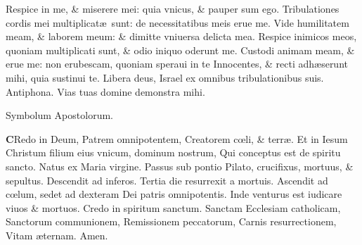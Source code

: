 \documentclass[a5paper,10pt]{book}
\def\ae{æ}
\def\oe{œ}
\begin{document}
\begin{multicols*}{2}
\newline \color{red} R\color{black}espice in me, \& miserere mei: quia vnicus, \& pauper sum ego.
\newline \color{red} T\color{black}ribulationes cordis mei multiplicat\ae \ sunt: de necessitatibus meis erue me.
\newline \color{red} V\color{black}ide humilitatem meam, \& laborem meum: \& dimitte vniuersa delicta mea.
\newline \color{red} R\color{black}espice inimicos meos, quoniam multiplicati sunt, \& odio iniquo oderunt me.
\newline \color{red} C\color{black}ustodi animam meam, \& erue me: non erubescam, quoniam speraui in te%
\newline \color{red} I\color{black}nnocentes, \& recti adh\ae serunt mihi, quia sustinui te.
\newline \color{red} L\color{black}ibera deus, Israel ex omnibus tribulationibus suis. \quad \color{red} Antiphona. \color{black} Vias tuas domine demonstra mihi. \color{black}
\vspace{-1em}
\begin{center} \color{red}
Symbolum Apostolorum.
\end{center}
\vspace{-1em}
\lettrine[lines=2]{\bfseries \color{red} C}{}Redo in Deum, 
\color{red} P\color{black}atrem omnipotentem,
\color{red} C\color{black}reatorem c\oe li, \& terr\ae .
\color{red} E\color{black}t in Iesum Christum filium eius vnicum, dominum nostrum,
\color{red} Q\color{black}ui conceptus est de spiritu sancto.
\color{red} N\color{black}atus ex Maria virgine.
\color{red} P\color{black}assus sub pontio Pilato, crucifixus, mortuus, \& sepultus.
\color{red} D\color{black}escendit ad inferos.
\color{red} T\color{black}ertia die resurrexit a mortuis.
\color{red} A\color{black}scendit ad c\oe lum, sedet ad dexteram Dei patris omnipotentis.
\color{red} I\color{black}nde venturus est iudicare viuos \& mortuos.
\newline \color{red} C\color{black}redo in spiritum sanctum.
\newline \color{red} S\color{black}anctam Ecclesiam catholicam,
\newline \color{red} S\color{black}anctorum communionem,
\newline \color{red} R\color{black}emissionem peccatorum,
\newline \color{red} C\color{black}arnis resurrectionem,
\newline \color{red} V\color{black}itam \ae ternam. Amen.

\end{multicols*}
\end{document}
